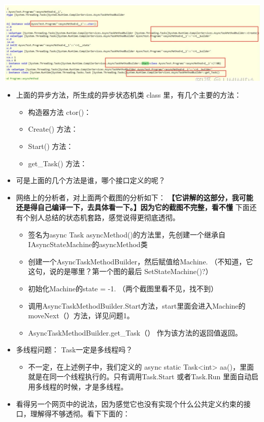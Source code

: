 \documentclass[9pt, b5paper]{article}
\begin{document}
\begin{center}
\includegraphics[width=.9\linewidth]{./pic/et3_20230609_112757.png}
\end{center}
\begin{itemize}
\item 上面的异步方法，所生成的异步状态机类 class 里，有几个主要的方法：
\begin{itemize}
\item 构造器方法 ctor()：
\item Create() 方法：
\item Start() 方法：
\item get\_Task() 方法：
\end{itemize}
\item 可是上面的几个方法是谁，哪个接口定义的呢？
\item 网络上的分析者，对上面两个截图的分析如下： \textbf{【它讲解的这部分，我可能还是得自己编译一下，去具体看一下。】因为它的截图不完整，看不懂} 下面还有个别人总结的状态机套路，感觉说得更彻底透彻。
\begin{itemize}
\item 签名为async Task asyncMethod()的方法里，先创建一个继承自IAsyncStateMachine的asyncMethod类
\item 创建一个AsyncTaskMethodBuilder，然后赋值给Machine. （不知道，它这句，说的是哪里？第一个图的最后 SetStateMachine()?）
\item 初始化Machine的state = -1. （两个截图里看不见，找不到）
\item 调用AsyncTaskMethodBuilder.Start方法，start里面会进入Machine的moveNext（）方法，详见问题1。
\item AsyncTaskMethodBuilder.get\_Task（） 作为该方法的返回值返回。
\end{itemize}
\item 多线程问题： Task一定是多线程吗？
\begin{itemize}
\item 不一定，在上述例子中，我们定义的 async static Task<int> aa()，里面就是在同一个线程执行的。只有调用Task.Start 或者Task.Run 里面自动启用多线程的时候，才是多线程。
\end{itemize}
\item 看得另一个网页中的说法，因为感觉它也没有实现个什么公共定义约束的接口，理解得不够透彻。看下下面的：

\end{itemize}
\end{document}
